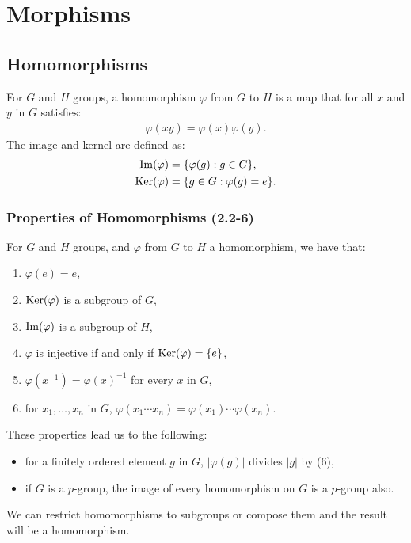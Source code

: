 \section{Morphisms}

\subsection{Homomorphisms}

For $G$ and $H$ groups, a homomorphism $\varphi$ from $G$ to $H$ is a map that 
for all $x$ and $y$ in $G$ satisfies:
\begin{align*}
    \varphi(xy) = \varphi(x)\varphi(y).
\end{align*} The image and kernel are defined as: \begin{align*}
    \operatorname{Im}(\varphi) &= \{\varphi(g) : g \in G\}, \\
    \operatorname{Ker}(\varphi) &= \{g \in G : \varphi(g) = e\}.
\end{align*} 

\subsubsection{Properties of Homomorphisms (2.2-6)} 
\label{2.2} \label{2.3} \label{2.4} \label{2.5} \label{2.6}

For $G$ and $H$ groups, and $\varphi$ from $G$ to $H$ a homomorphism, we have that:
\begin{enumerate}
    \item $\varphi(e) = e$,
    \item $\operatorname{Ker}(\varphi)$ is a subgroup of $G$,
    \item $\operatorname{Im}(\varphi)$ is a subgroup of $H$,
    \item $\varphi$ is injective if and only if $\operatorname{Ker}(\varphi) = \{e\}$,
    \item $\varphi(x^{-1}) = \varphi(x)^{-1}$ for every $x$ in $G$,
    \item for $x_1, \ldots, x_n$ in $G$,
        $\varphi(x_1 \cdots x_n) = \varphi(x_1) \cdots \varphi(x_n)$.
\end{enumerate} These properties lead us to the following: \begin{itemize}
    \item for a finitely ordered element $g$ in $G$, $|\varphi(g)|$
        divides $|g|$ by (6),
    \item if $G$ is a $p$-group, the image of every
        homomorphism on $G$ is a $p$-group also.
\end{itemize} We can restrict homomorphisms to subgroups or compose them
and the result will be a homomorphism.

